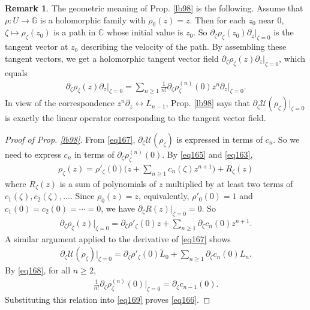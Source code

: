 \documentclass[11pt,b5paper,notitlepage]{article}
\theoremstyle{definition}
\newtheorem{rem}[df]{Remark}
\theoremstyle{plain}
\newcommand{\mc}{\mathcal}
\newcommand{\wtd}{\widetilde}
\newcommand{\Gbb}{\mathbb G}
\newcommand{\Cbb}{\mathbb C}
\numberwithin{equation}{section}
\begin{document}
\begin{rem}\label{lb112}
The geometric meaning of Prop. \ref{lb98} is the following. Assume that $\rho:U\rightarrow\Gbb$ is a holomorphic family with $\rho_0(z)=z$. Then for each $z_0$ near $0$, $\zeta\mapsto \rho_\zeta(z_0)$ is a path in $\Cbb$ whose initial value is $z_0$. So $\partial_\zeta\rho_\zeta(z_0)\partial_z\big|_{\zeta=0}$ is the tangent vector at $z_0$ describing the velocity of the path. By assembling these tangent vectors, we get a holomorphic tangent vector field $\partial_\zeta\rho_\zeta(z)\partial_z\big|_{\zeta=0}$, which equals
\begin{align}
\partial_\zeta\rho_\zeta(z)\partial_z\Big|_{\zeta=0}=\sum_{n\geq 1}\frac 1{n!}\partial_\zeta\rho_\zeta^{(n)}(0)z^n\partial_z\Big|_{\zeta=0}.
\end{align}
In view of the correspondence $z^n\partial_z\leftrightarrow L_{n-1}$, Prop. \ref{lb98} says that $\partial_\zeta\mc U(\rho_\zeta)\big|_{\zeta=0}$ is exactly the linear operator corresponding to the tangent vector field.
\end{rem}




\begin{proof}[Proof of Prop. \ref{lb98}]
From \eqref{eq167}, $\partial_\zeta \mc U(\rho_\zeta)$ is expressed in terms of $c_n$. So we need to express $c_n$ in terms of $\partial_\zeta\rho_\zeta^{(n)}(0)$. By \eqref{eq165} and \eqref{eq163},
\begin{align*}
\rho_\zeta(z)=\rho'_\zeta(0)\Big(z+\sum_{n\geq 1}c_n(\zeta)z^{n+1}\Big)+R_\zeta(z)	
\end{align*}
where $R_\zeta(z)$ is a sum of polynomials of $z$ multiplied by at least two terms of $c_1(\zeta),c_2(\zeta),\dots$. Since $\rho_0(z)=z$, equivalently, $\rho'_0(0)=1$ and $c_1(0)=c_2(0)=\cdots=0$, we have $\partial_\zeta R(z)|_{\zeta=0}=0$. So
\begin{align}
\partial_\zeta\rho_\zeta(z)\Big|_{\zeta=0}=\partial_\zeta\rho'_\zeta(0)z+\sum_{n\geq 1}\partial_\zeta c_n(0) z^{n+1}.\label{eq168}
\end{align}
A similar argument applied to the derivative of \eqref{eq167} shows
\begin{align}
\partial_\zeta\mc U(\rho_\zeta)\Big|_{\zeta=0}=\partial_\zeta\rho'_\zeta(0)\wtd L_0+\sum_{n\geq 1}\partial_\zeta c_n(0)L_n.	\label{eq169}
\end{align}
By \eqref{eq168}, for all $n\geq 2$,
\begin{align*}
\frac 1{n!}\partial_\zeta\rho^{(n)}_\zeta(0)	\Big|_{\zeta=0}=\partial_\zeta c_{n-1}(0).
\end{align*}
Substituting this relation into \eqref{eq169} proves \eqref{eq166}.
\end{proof}
\end{document}
